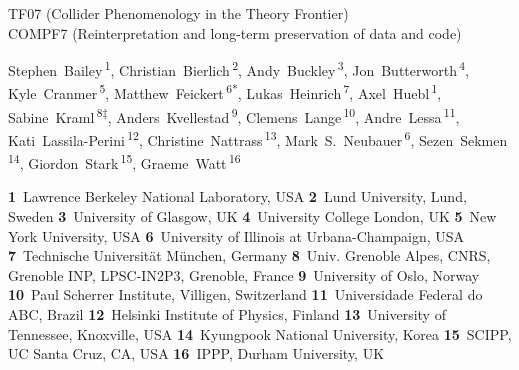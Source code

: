 \documentclass[11pt]{article}
\begin{document}
\pubblock
\snowmass{}


\begin{center}{\large
TF07 (Collider Phenomenology in the Theory Frontier)\\
COMPF7 (Reinterpretation and long-term preservation of data and code)}
\end{center}

\begin{center}
Stephen~Bailey\,\textsuperscript{1}, 
Christian~Bierlich\,\textsuperscript{2},
Andy~Buckley\,\textsuperscript{3},
Jon~Butterworth\,\textsuperscript{4},
Kyle~Cranmer\,\textsuperscript{5},
Matthew~Feickert\,\textsuperscript{6*},
Lukas~Heinrich\,\textsuperscript{7},
Axel~Huebl\,\textsuperscript{1},  
Sabine~Kraml\,\textsuperscript{8$\ddagger$},
Anders~Kvellestad\,\textsuperscript{9},
Clemens~Lange\,\textsuperscript{10},
Andre~Lessa\,\textsuperscript{11},
Kati~Lassila-Perini\,\textsuperscript{12},
Christine~Nattrass\,\textsuperscript{13},
Mark~S.~Neubauer\,\textsuperscript{6},  
Sezen~Sekmen\,\textsuperscript{14},
Giordon~Stark\,\textsuperscript{15},
Graeme~Watt\,\textsuperscript{16}
\end{center}

\begin{center}
\textbf{1}~Lawrence Berkeley National Laboratory, USA
\textbf{2}~Lund University, Lund, Sweden
\textbf{3}~University of Glasgow, UK
\textbf{4}~University College London, UK
\textbf{5}~New York University, USA
\textbf{6}~University of Illinois at Urbana-Champaign, USA
\textbf{7}~Technische Universität München, Germany
\textbf{8}~Univ. Grenoble Alpes, CNRS, Grenoble INP, LPSC-IN2P3, Grenoble, France
\textbf{9}~University of Oslo, Norway
\textbf{10}~Paul Scherrer Institute, Villigen, Switzerland
\textbf{11}~Universidade Federal do ABC, Brazil
\textbf{12}~Helsinki Institute of Physics, Finland
\textbf{13}~University of Tennessee, Knoxville, USA
\textbf{14}~Kyungpook National University, Korea
\textbf{15}~SCIPP, UC Santa Cruz, CA, USA
\textbf{16}~IPPP, Durham University, UK
\end{center}
\end{document}
